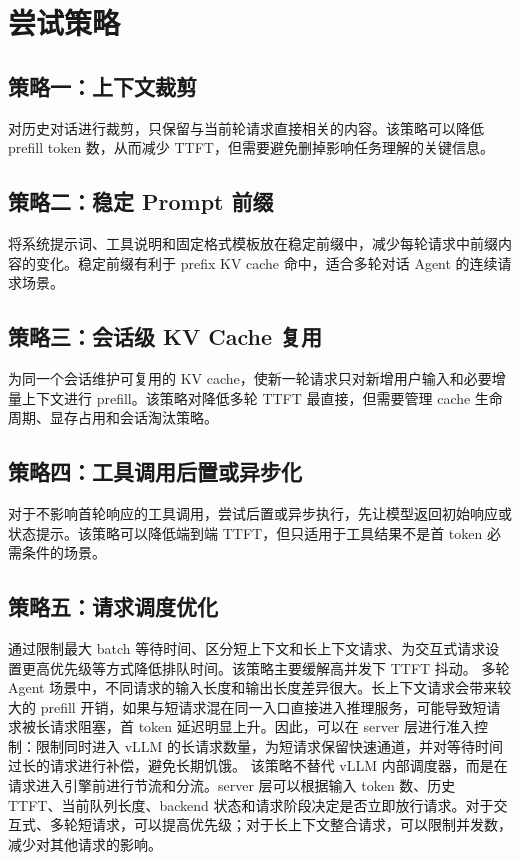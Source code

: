 \section{尝试策略}

\subsection{策略一：上下文裁剪}

对历史对话进行裁剪，只保留与当前轮请求直接相关的内容。该策略可以降低 prefill token 数，从而减少 TTFT，但需要避免删掉影响任务理解的关键信息。

\subsection{策略二：稳定 Prompt 前缀}

将系统提示词、工具说明和固定格式模板放在稳定前缀中，减少每轮请求中前缀内容的变化。稳定前缀有利于 prefix KV cache 命中，适合多轮对话 Agent 的连续请求场景。

\subsection{策略三：会话级 KV Cache 复用}

为同一个会话维护可复用的 KV cache，使新一轮请求只对新增用户输入和必要增量上下文进行 prefill。该策略对降低多轮 TTFT 最直接，但需要管理 cache 生命周期、显存占用和会话淘汰策略。

\subsection{策略四：工具调用后置或异步化}

对于不影响首轮响应的工具调用，尝试后置或异步执行，先让模型返回初始响应或状态提示。该策略可以降低端到端 TTFT，但只适用于工具结果不是首 token 必需条件的场景。

\subsection{策略五：请求调度优化}

通过限制最大 batch 等待时间、区分短上下文和长上下文请求、为交互式请求设置更高优先级等方式降低排队时间。该策略主要缓解高并发下 TTFT 抖动。
多轮 Agent 场景中，不同请求的输入长度和输出长度差异很大。长上下文请求会带来较大的 prefill 开销，如果与短请求混在同一入口直接进入推理服务，可能导致短请求被长请求阻塞，首 token 延迟明显上升。因此，可以在 server 层进行准入控制：限制同时进入 vLLM 的长请求数量，为短请求保留快速通道，并对等待时间过长的请求进行补偿，避免长期饥饿。
该策略不替代 vLLM 内部调度器，而是在请求进入引擎前进行节流和分流。server 层可以根据输入 token 数、历史 TTFT、当前队列长度、backend 状态和请求阶段决定是否立即放行请求。对于交互式、多轮短请求，可以提高优先级；对于长上下文整合请求，可以限制并发数，减少对其他请求的影响。


